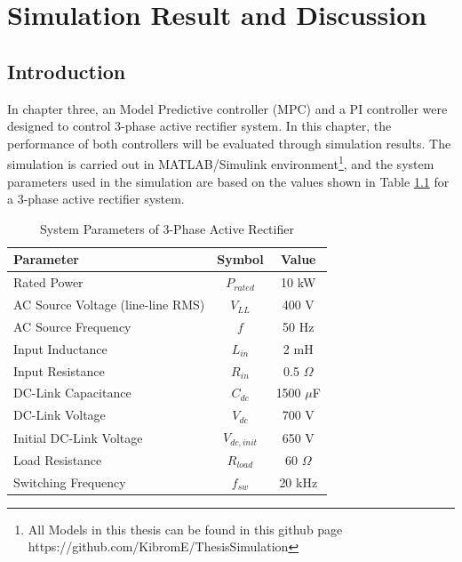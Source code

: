 \chapter{Simulation Result and Discussion}\label{SimulationResult}
\section{Introduction}
In chapter three, an Model Predictive controller (MPC) and a PI controller were designed to control
3-phase active rectifier system. In this chapter, the performance of both controllers will be evaluated
through simulation results. The simulation is carried out in MATLAB/Simulink environment\footnote{All Models in this thesis can be found in this github page https://github.com/KibromE/ThesisSimulation }, 
and the system parameters used in the simulation are based on the values shown in Table \ref{tab:system_parameters}
for a 3-phase active rectifier system.\par
\vspace{1cm}
\begin{table}[htbp]
    \centering
    \caption{System Parameters of 3-Phase Active Rectifier \cite{Saadaoui2026}}
    \begin{tabular}{|l|c|c|}
        \hline
        \textbf{Parameter} & \textbf{Symbol} & \textbf{ Value} \\ \hline
        Rated Power & $P_{rated}$ & 10 kW \\ \hline
        AC Source Voltage (line-line RMS) & $V_{LL}$ & 400 V \\ \hline
        AC Source Frequency & $f$ & 50 Hz \\ \hline
        Input Inductance & $L_{in}$ & 2 mH \\ \hline
        Input Resistance & $R_{in}$ & 0.5 $\Omega$ \\ \hline
        DC-Link Capacitance & $C_{dc}$ & 1500 $\mu$F \\ \hline
        DC-Link Voltage & $V_{dc}$ & 700 V \\ \hline
        Initial DC-Link Voltage & $V_{dc,init}$ & 650 V \\ \hline
        Load Resistance & $R_{load}$ & 60 $\Omega$ \\ \hline
        Switching Frequency & $f_{sw}$ & 20 kHz \\ \hline
    \end{tabular}
    \label{tab:system_parameters}
\end{table}
\vspace{1cm}
